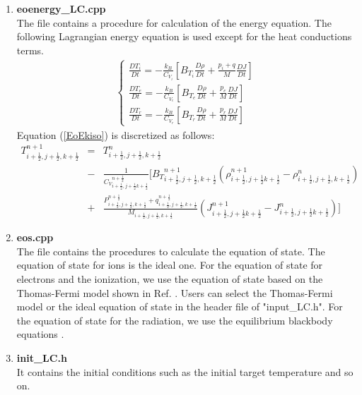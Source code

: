 \begin{enumerate}
\item {\bf eoenergy\_LC.cpp}\\
The file contains a procedure for calculation of the energy equation. The following Lagrangian energy equation is used except for the heat conductions terms.
	\begin{eqnarray}
	\label{EoEkiso}
	\begin{cases}
		\frac{DT_i}{Dt}=-\frac{k_B}{C_{V_i}}\left[B_{T_i}\frac{D\rho}{Dt}+\frac{p_i+q}{M}\frac{DJ}{Dt}\right]\\
		\frac{DT_e}{Dt}=-\frac{k_B}{C_{V_e}}\left[B_{T_e}\frac{D\rho}{Dt}+\frac{p_e}{M}\frac{DJ}{Dt}\right]\\
		\frac{DT_r}{Dt}=-\frac{k_B}{C_{V_r}}\left[B_{T_r}\frac{D\rho}{Dt}+\frac{p_r}{M}\frac{DJ}{Dt}\right]
	\end{cases}
	\end{eqnarray}
Equation (\ref{EoEkiso}) is discretized as follows: 
	\small \begin{eqnarray}
		T^{n+1}_{i+\frac{1}{2},j+\frac{1}{2},k+\frac{1}{2}}&=&T^n_{i+\frac{1}{2},j+\frac{1}{2},k+\frac{1}{2}}\nonumber\\
		&-&\frac{1}{{C_V}^{n+\frac{1}{2}}_{i+\frac{1}{2},j+\frac{1}{2}k+\frac{1}{2}}}\Bigg[{B_T}^{n+1}_{i+\frac{1}{2},j+\frac{1}{2},k+\frac{1}{2}}(\rho^{n+1}_{i+\frac{1}{2},j+\frac{1}{2}k+\frac{1}{2}}-\rho^n_{i+\frac{1}{2},j+\frac{1}{2},k+\frac{1}{2}})\nonumber\\
		&+&\frac{P^{n+\frac{1}{2}}_{i+\frac{1}{2},j+\frac{1}{2},k+\frac{1}{2}}+q^{n+\frac{1}{2}}_{i+\frac{1}{2},j+\frac{1}{2},k+\frac{1}{2}}}{M_{i+\frac{1}{2},j+\frac{1}{2},k+\frac{1}{2}}}(J^{n+1}_{i+\frac{1}{2},j+\frac{1}{2}k+\frac{1}{2}}-J^n_{i+\frac{1}{2},j+\frac{1}{2}k+\frac{1}{2}})\Bigg]\nonumber
	\end{eqnarray}
	
\normalsize	
\item {\bf eos.cpp}\\
The file contains the procedures to calculate the equation of state. The equation of state for ions is the ideal one. For the equation of state for electrons and the ionization, we use the equation of state based on the Thomas-Fermi model shown in Ref. \cite{Bell}. Users can select the Thomas-Fermi model or the ideal equation of state in the header file of "input\_LC.h". For the equation of state for the radiation, we use the equilibrium blackbody equations \cite{Zeldovich}. 
	
\item {\bf init\_LC.h}\\
It contains the initial conditions such as the initial target temperature and so on. 


\end{enumerate}
